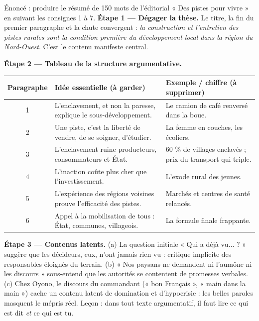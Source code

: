 \documentclass[11pt]{article}
\begin{document}
\begin{exoresolu}
Énoncé : produire le résumé de 150 mots de l'éditorial « Des pistes pour vivre » en suivant les consignes 1 à 7.
\tcblower
\textbf{Étape 1 — Dégager la thèse.} Le titre, la fin du premier paragraphe et la chute convergent : \emph{la construction et l'entretien des pistes rurales sont la condition première du développement local dans la région du Nord-Ouest}. C'est le contenu manifeste central.

\textbf{Étape 2 — Tableau de la structure argumentative.}

\begin{center}
\begin{tabularx}{\linewidth}{|c|X|X|}
\hline
\rowcolor{popblueL} \textbf{Paragraphe} & \textbf{Idée essentielle (à garder)} & \textbf{Exemple / chiffre (à supprimer)} \\
\hline
1 & L'enclavement, et non la paresse, explique le sous-développement. & Le camion de café renversé dans la boue. \\
\hline
2 & Une piste, c'est la liberté de vendre, de se soigner, d'étudier. & La femme en couches, les écoliers. \\
\hline
3 & L'enclavement ruine producteurs, consommateurs et État. & 60 \% de villages enclavés ; prix du transport qui triple. \\
\hline
4 & L'inaction coûte plus cher que l'investissement. & L'exode rural des jeunes. \\
\hline
5 & L'expérience des régions voisines prouve l'efficacité des pistes. & Marchés et centres de santé relancés. \\
\hline
6 & Appel à la mobilisation de tous : État, communes, villageois. & La formule finale frappante. \\
\hline
\end{tabularx}
\end{center}

\textbf{Étape 3 — Contenus latents.} (a) La question initiale « Qui a déjà vu... ? » suggère que les décideurs, eux, n'ont jamais rien vu : critique implicite des responsables éloignés du terrain. (b) « Nos paysans ne demandent ni l'aumône ni les discours » sous-entend que les autorités se contentent de promesses verbales. (c) Chez Oyono, le discours du commandant (« bon Français », « main dans la main ») cache un contenu latent de domination et d'hypocrisie : les belles paroles masquent le mépris réel. Leçon : dans tout texte argumentatif, il faut lire ce qui est dit \emph{et} ce qui est tu.


\end{exoresolu}
\end{document}
